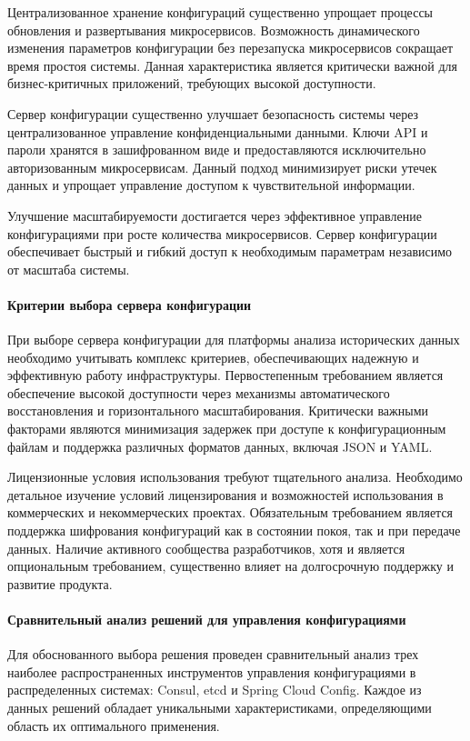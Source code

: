 Централизованное хранение конфигураций существенно упрощает процессы обновления и развертывания микросервисов.
Возможность динамического изменения параметров конфигурации без перезапуска микросервисов сокращает время простоя системы. Данная характеристика является критически важной для бизнес-критичных приложений, требующих высокой доступности.

Сервер конфигурации существенно улучшает безопасность системы через централизованное управление конфиденциальными данными.
Ключи API и пароли хранятся в зашифрованном виде и предоставляются исключительно авторизованным микросервисам. Данный подход минимизирует риски утечек данных и упрощает управление доступом к чувствительной информации.

Улучшение масштабируемости достигается через эффективное управление конфигурациями при росте количества микросервисов. Сервер конфигурации обеспечивает быстрый и гибкий доступ к необходимым параметрам независимо от масштаба системы.

\paragraph{Критерии выбора сервера конфигурации}

При выборе сервера конфигурации для платформы анализа исторических данных необходимо учитывать комплекс критериев, обеспечивающих надежную и эффективную работу инфраструктуры.
Первостепенным требованием является обеспечение высокой доступности через механизмы автоматического восстановления и горизонтального масштабирования. Критически важными факторами являются минимизация задержек при доступе к конфигурационным файлам и поддержка различных форматов данных, включая JSON и YAML.

Лицензионные условия использования требуют тщательного анализа. Необходимо детальное изучение условий лицензирования и возможностей использования в коммерческих и некоммерческих проектах.
Обязательным требованием является поддержка шифрования конфигураций как в состоянии покоя, так и при передаче данных. Наличие активного сообщества разработчиков, хотя и является опциональным требованием, существенно влияет на долгосрочную поддержку и развитие продукта.

\paragraph{Сравнительный анализ решений для управления конфигурациями}

Для обоснованного выбора решения проведен сравнительный анализ трех наиболее распространенных инструментов управления конфигурациями в распределенных системах: Consul, etcd и Spring Cloud Config. Каждое из данных решений обладает уникальными характеристиками, определяющими область их оптимального применения.

